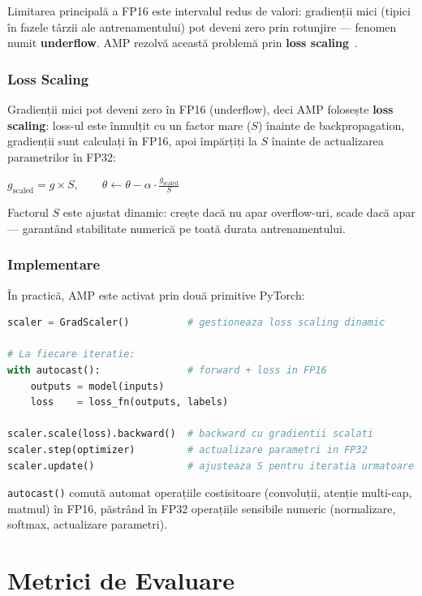 \documentclass[12pt, a4paper]{report}
\newcommand{\formula}[1]{%
    \begin{center}
        \colorbox{codebackground}{%
            \parbox{0.88\textwidth}{\centering\vspace{4pt}$#1$\vspace{4pt}}%
        }
    \end{center}
}
\begin{document}
Limitarea principală a FP16 este intervalul redus de valori: gradienții
mici (tipici în fazele târzii ale antrenamentului) pot deveni zero prin
rotunjire — fenomen numit \textbf{underflow}. AMP rezolvă această
problemă prin \textbf{loss scaling}~\cite{micikevicius2018mixedprecision}.

\subsection{Loss Scaling}

Gradienții mici pot deveni zero în FP16 (underflow), deci AMP folosește \textbf{loss scaling}:
loss-ul este înmulțit cu un factor mare ($S$) înainte de backpropagation, gradienții sunt
calculați în FP16, apoi împărțiți la $S$ înainte de actualizarea parametrilor în FP32:

\formula{
    g_{\text{scaled}} = g \times S, \qquad
    \theta \leftarrow \theta - \alpha \cdot \frac{g_{\text{scaled}}}{S}
}

Factorul $S$ este ajustat dinamic: crește dacă nu apar overflow-uri,
scade dacă apar — garantând stabilitate numerică pe toată durata
antrenamentului.

\subsection{Implementare}

În practică, AMP este activat prin două primitive PyTorch:

\begin{lstlisting}[language=Python]
scaler = GradScaler()          # gestioneaza loss scaling dinamic

# La fiecare iteratie:
with autocast():               # forward + loss in FP16
    outputs = model(inputs)
    loss    = loss_fn(outputs, labels)

scaler.scale(loss).backward()  # backward cu gradientii scalati
scaler.step(optimizer)         # actualizare parametri in FP32
scaler.update()                # ajusteaza S pentru iteratia urmatoare
\end{lstlisting}

\texttt{autocast()} comută automat operațiile costisitoare
(convoluții, atenție multi-cap, matmul) în FP16, păstrând în FP32
operațiile sensibile numeric (normalizare, softmax, actualizare
parametri).

\chapter{Metrici de Evaluare}
\end{document}
